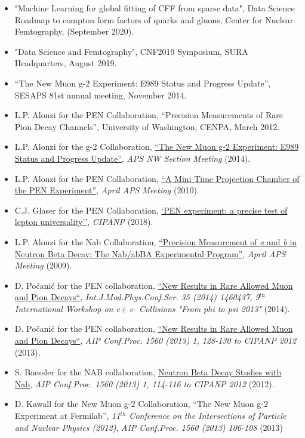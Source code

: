 \documentclass[10pt]{article}
\begin{document}
\begin{itemize}
\item "Machine Learning for global fitting of CFF from sparse data", Data Science Roadmap to compton form factors of quarks and gluons, Center for Nuclear Femtography, (September 2020).
\item "Data Science and Femtography", CNF2019 Symposium, SURA Headquarters, August 2019.
\item ``The New Muon g-2 Experiment: E989 Status and Progress Update'', SESAPS 81st annual meeting, November 2014.
\item L.P. Alonzi for the PEN Collaboration, ``Precision Measurements of Rare Pion Decay Channels'', University of Washington, CENPA, March 2012.
\item L.P. Alonzi for the g-2 Collaboration, \href{http://pen.phys.virginia.edu/lpa2a-docs/2014-05-02-Alonzi-APSNWSection.pdf}{``The New Muon g-2 Experiment: E989 Status and Progress Update''}, \emph{APS NW Section Meeting} (2014).
\item L.P. Alonzi for the PEN Collaboration, \href{http://pen.phys.virginia.edu/talks/2010_April_APS_alonzi.pdf}{``A Mini Time Projection Chamber of the PEN Experiment''}, \emph{April APS Meeting} (2010).
\item C.J. Glaser for the PEN Collaboration, \href{https://inspirehep.net/literature/1706145}{`PEN experiment: a precise test of lepton universality''}, \emph{CIPANP} (2018).
\item L.P. Alonzi for the Nab Collaboration, \href{http://nab.phys.virginia.edu/slides/2009_April_APS_Alonzi.pdf}{``Precision Measurement of \emph{a} and \emph{b} in Neutron Beta Decay: The Nab/abBA Experimental Program''}, \emph{April APS Meeting} (2009).
\item D. Po\v{c}ani\'c for the PEN collaboration, \href{https://inspirehep.net/literature/1287740}{``New Results in Rare Allowed Muon and Pion Decays``}, \emph{Int.J.Mod.Phys.Conf.Ser. 35 (2014) 1460437, 9$^{th}$ International Workshop on e+ e- Collisions "From phi to psi 2013"} (2014).
\item D. Po\v{c}ani\'c for the PEN collaboration, \href{https://inspirehep.net/literature/1191427}{``New Results in Rare Allowed Muon and Pion Decays``}, \emph{AIP Conf.Proc. 1560 (2013) 1, 128-130 to CIPANP 2012} (2013).
\item S. Baessler for the NAB collaboration, \href{https://inspirehep.net/literature/1187655}{Neutron Beta Decay Studies with Nab}, \emph{AIP Conf.Proc. 1560 (2013) 1, 114-116 to CIPANP 2012} (2012).
\item D. Kawall for the New Muon g-2 Collaboration, ``The New Muon g-2 Experiment at Fermilab'', \emph{11$^{th}$ Conference on the Intersections of Particle and Nuclear Physics (2012)}, \emph{AIP Conf.Proc. 1560 (2013) 106-108} (2013)

\end{itemize}
\end{document}
